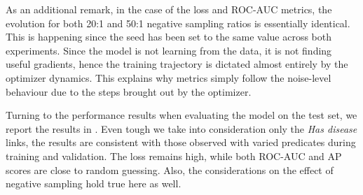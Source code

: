 As an additional remark, in the case of the loss and ROC-AUC metrics, the evolution for both 20:1 and 50:1 negative sampling ratios is essentially identical. This is happening since the seed has been set to the same value across both experiments. Since the model is not learning from the data, it is not finding useful gradients, hence the training trajectory is dictated almost entirely by the optimizer dynamics. This explains why metrics simply follow the noise-level behaviour due to the steps brought out by the optimizer.

\medskip



Turning to the performance results when evaluating the model on the test set, we report the results in . Even tough we take into consideration only the \emph{Has disease} links, the results are consistent with those observed with varied predicates during training and validation. The loss remains high, while both ROC-AUC and AP scores are close to random guessing. Also, the considerations on the effect of negative sampling hold true here as well.



